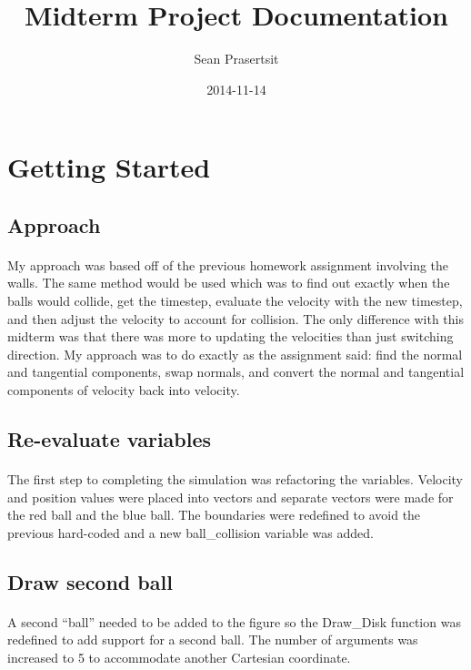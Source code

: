 \documentclass[12pt]{report}
\begin{document}
\title{Midterm Project Documentation}
\author{Sean Prasertsit}
\date{2014-11-14}
\maketitle

\section{Getting Started}

\subsection{Approach}
\paragraph{}	My approach was based off of the previous homework assignment involving the walls. The same method would be used which was to find out exactly when the balls would collide, get the timestep, evaluate the velocity with the new timestep, and then adjust the velocity to account for collision. The only difference with this midterm was that there was more to updating the velocities than just switching direction. My approach was to do exactly as the assignment said: find the normal and tangential components, swap normals, and convert the normal and tangential components of velocity back into velocity.

\subsection{Re-evaluate variables}
\paragraph{}	The first step to completing the simulation was refactoring the variables. Velocity and position values were placed into vectors and separate vectors were made for the red ball and the blue ball. The boundaries were redefined to avoid the previous hard-coded and a new {\ttfamily ball\_collision} variable was added.

\subsection{Draw second ball}
\paragraph{}	A second ``ball'' needed to be added to the figure so the {\ttfamily Draw\_Disk} function was redefined to add support for a second ball. The number of arguments was increased to 5 to accommodate another Cartesian coordinate.
\end{document}
